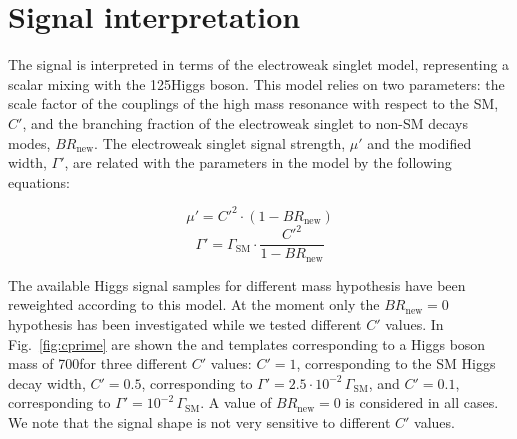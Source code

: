 

\section{Signal interpretation}
\label{sec:signalModel}
The signal is interpreted in terms of the electroweak singlet model, representing a scalar mixing with the 125\GeV Higgs boson. This model relies on two parameters: the scale factor of the couplings of the high mass resonance with respect to the SM, $C'$, and the branching fraction of the electroweak singlet to non-SM decays modes, $BR_\mathrm{new}$. The electroweak singlet signal strength, $\mu'$ and the modified width, $\Gamma'$, are related with the parameters in the model by the following equations:

\begin{equation}
\mu' = C'^2 \cdot (1 - BR_\mathrm{new})
\end{equation}
\begin{equation}
\Gamma' = \Gamma_\mathrm{SM} \cdot \frac{C'^2}{1 - BR_\mathrm{new}}
\end{equation}

The available Higgs signal samples for different mass hypothesis have been reweighted according to this model. At the moment only the $BR_\mathrm{new} = 0$ hypothesis has been investigated while we tested different $C'$ values.
In Fig.~\ref{fig:cprime} are shown the \mll and \mt templates corresponding to a Higgs boson mass of 700\GeV for three different $C'$ values: $C' = 1$, corresponding to the SM Higgs decay width, $C'=0.5$, corresponding to $\Gamma' = 2.5\cdot10^{-2}\,\Gamma_\mathrm{SM}$, and $C'=0.1$, corresponding to $\Gamma' = 10^{-2}\,\Gamma_\mathrm{SM}$. A value of $BR_\mathrm{new} = 0$ is considered in all cases. We note that the signal shape is not very sensitive to different $C'$ values.

